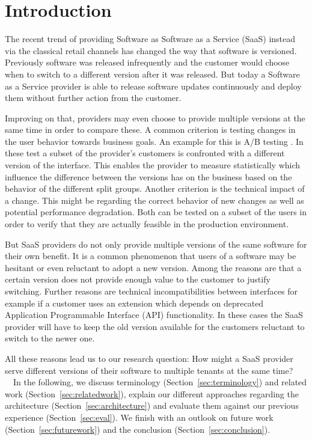 
\section{Introduction}

The recent trend of providing Software as Software as a Service (SaaS) instead via the classical retail channels has changed the way that software is versioned. Previously software was released infrequently and the customer would choose when to switch to a different version after it was released. But today a Software as a Service provider is able to release software updates continuously and deploy them without further action from the customer.

Improving on that, providers may even choose to provide multiple versions at the same time in order to compare these. A common criterion is testing changes in the user behavior towards business goals. An example for this is A/B testing \cite{Kohavi2007}. In these test a subset of the provider's customers is confronted with a different version of the interface. This enables the provider to measure statistically which influence the difference between the versions has on the business based on the behavior of the different split groups. Another criterion is the technical impact of a change. This might be regarding the correct behavior of new changes as well as potential performance degradation. Both can be tested on a subset of the users in order to verify that they are actually feasible in the production environment.

But SaaS providers do not only provide multiple versions of the same software for their own benefit. It is a common phenomenon that users of a software may be hesitant or even reluctant to adopt a new version. Among the reasons are that a certain version does not provide enough value to the customer to justify switching. Further reasons are technical incompatibilities between interfaces for example if a customer uses an extension which depends on deprecated Application Programmable Interface (API) functionality.
In these cases the SaaS provider will have to keep the old version available for the customers reluctant to switch to the newer one.

All these reasons lead us to our research question: How might a SaaS provider serve different versions of their software to multiple tenants at the same time?
\ \ In the following, we discuss terminology (Section~\ref{sec:terminology}) and related work (Section~\ref{sec:relatedwork}), explain our different approaches regarding the architecture (Section~\ref{sec:architecture}) and evaluate them against our previous experience (Section~\ref{sec:eval}). We finish with an outlook on future work (Section~\ref{sec:futurework}) and the conclusion (Section~\ref{sec:conclusion}).


